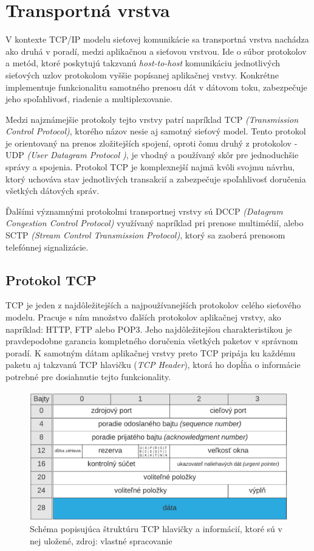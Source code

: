 \documentclass[
  digital, %
  table,   %
  lof,     %
  nolot,   %
  nocover
]{fithesis3}
\begin{document}
\section{Transportná vrstva}
V kontexte TCP/IP modelu sieťovej komunikácie sa transportná vrstva nachádza
ako druhá v poradí, medzi aplikačnou a sieťovou vrstvou. Ide o súbor protokolov
a metód, ktoré poskytujú takzvanú \textit{host-to-host} komunikáciu
jednotlivých sieťových uzlov protokolom vyššie popísanej aplikačnej vrstvy.
Konkrétne implementuje funkcionalitu samotného prenosu dát v dátovom toku,
zabezpečuje jeho spoľahlivosť, riadenie a multiplexovanie. 

Medzi najznámejšie protokoly tejto vrstvy patrí napríklad TCP
\textit{(Transmission Control Protocol)}, ktorého názov nesie aj samotný
sieťový model. Tento protokol je orientovaný na prenos zložitejších spojení,
oproti čomu druhý z protokolov - UDP \textit{(User Datagram Protocol )}, je
vhodný a používaný skôr pre jednoduchšie správy a spojenia. Protokol TCP je
komplexnejší najmä kvôli svojmu návrhu, ktorý uchováva stav jednotlivých
transakcií a zabezpečuje spoľahlivosť doručenia všetkých dátových správ. 

Ďalšími
významnými protokolmi transportnej vrstvy sú DCCP
\textit{(Datagram Congestion Control Protocol)} využívaný napríklad pri prenose
multimédií, alebo SCTP \textit{(Stream Control Transmission Protocol)}, ktorý
sa zaoberá prenosom telefónnej signalizácie.

\subsection{Protokol TCP}
TCP je jeden z najdôležitejších a najpoužívanejších protokolov celého sieťového
modelu. Pracuje s ním množstvo ďalších protokolov aplikačnej vrstvy, ako
napríklad: HTTP, FTP alebo POP3. Jeho najdôležitejšou charakteristikou je
pravdepodobne garancia kompletného doručenia všetkých paketov v správnom
poradí. K samotným dátam aplikačnej vrstvy preto TCP pripája ku každému paketu
aj takzvanú TCP hlavičku (\textit{TCP Header}), ktorá ho dopĺňa o informácie
potrebné pre dosiahnutie tejto funkcionality.

\begin{figure}[h]
  \centering
    \includegraphics[width=.95\textwidth]{images/net-tcp-head.png}
  \caption{Schéma popisujúca štruktúru TCP hlavičky a informácií, ktoré sú v
  nej uložené, zdroj: vlastné spracovanie}
  \label{fig:net-tcp-head}
\end{figure}
\end{document}
